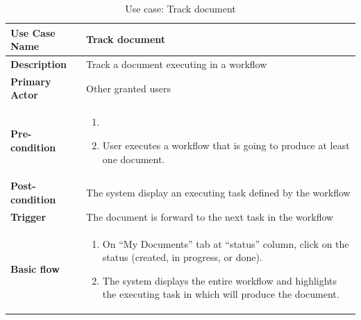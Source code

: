\begin{table}
	\centering
	\caption{Use case: Track document}
	\begin{tabular}{|l|L{9cm}|}
		\hline
		\textbf{Use Case Name} & Track document \\
		\hline
		
		\textbf{Description} & Track a document executing in a workflow \\
		\textbf{Primary Actor} & Other granted users \\
		\textbf{Pre-condition} & 
		\begin{enumerate}
			\item \alreadylogin
			\item User executes a workflow that is going to produce at least one document.
		\end{enumerate} \\
		\textbf{Post-condition} & The system display an executing task defined by the workflow \\
		\textbf{Trigger} & The document is forward to the next task in the workflow \\
		\textbf{Basic flow} & 
		\begin{enumerate}
			\item On \enquote{My Documents} tab at \enquote{status} column, click on the status (created, in progress, or done).
			\item The system displays the entire workflow and highlights the executing task in which will produce the document.
		\end{enumerate} \\
		\hline
	\end{tabular}
\end{table}

